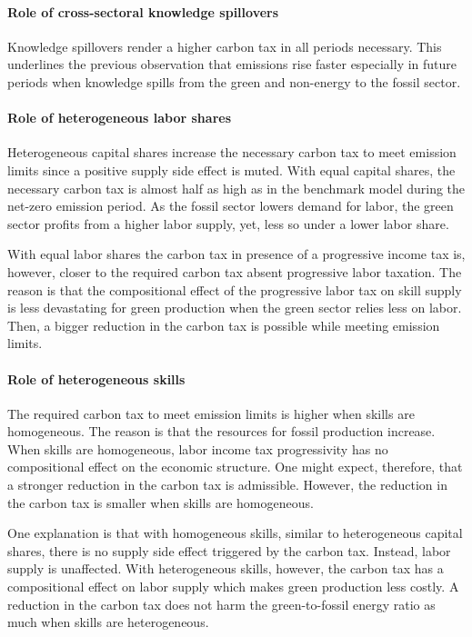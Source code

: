 \paragraph{Role of cross-sectoral knowledge spillovers}
Knowledge spillovers render a higher carbon tax in all periods necessary. This underlines the previous observation that emissions rise faster especially in future periods when knowledge spills from the green and non-energy to the fossil sector.

\paragraph{Role of heterogeneous labor shares}
Heterogeneous capital shares increase the necessary carbon tax to meet emission limits since a positive supply side effect is muted. 
With equal capital shares, the necessary carbon tax is almost half as high as in the benchmark model during the net-zero emission period. 
As the fossil sector lowers demand for labor, the green sector profits from a higher labor supply, yet, less so under a lower labor share.  

With equal labor shares the carbon tax in presence of a progressive income tax is, however, closer to the required carbon tax absent progressive labor taxation.  The reason is that the compositional effect of the  progressive labor tax on skill supply is less devastating for green production when the green sector relies less on labor. Then, a bigger reduction in the carbon tax is possible while meeting emission limits. 
%
\paragraph{Role of heterogeneous skills}
%
The required carbon tax to meet emission limits is higher when skills are homogeneous. The reason is that the resources for fossil production increase.
When skills are homogeneous, labor income tax progressivity has no compositional effect on the economic structure. One might expect, therefore, that a stronger reduction in the carbon tax is admissible. However, the reduction in the carbon tax is smaller when skills are homogeneous. 

One explanation is that with homogeneous skills, similar to heterogeneous capital shares, there is no supply side effect triggered by the carbon tax. Instead, labor supply is unaffected. With heterogeneous skills, however, the carbon tax has a compositional effect on labor supply which makes green production less costly. A reduction in the carbon tax does not harm the green-to-fossil energy ratio as much when skills are heterogeneous. 

